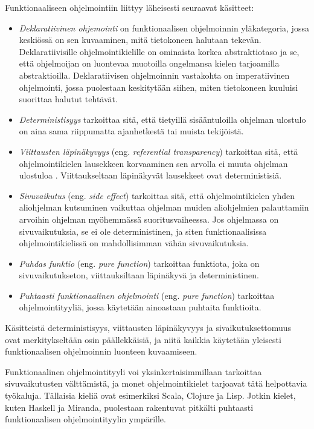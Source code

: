 Funktionaaliseen ohjelmointiin liittyy läheisesti seuraavat käsitteet:
\begin{itemize}
	\item \textit{Deklaratiivinen ohjemointi} on funktionaalisen ohjelmoinnin yläkategoria, jossa keskiössä on sen kuvaaminen, mitä tietokoneen halutaan tekevän. Deklaratiivisille ohjelmointikielille on ominaista korkea abstraktiotaso ja se, että ohjelmoijan on luontevaa muotoilla ongelmansa kielen tarjoamilla abstraktioilla. Deklaratiivisen ohjelmoinnin vastakohta on imperatiivinen ohjelmointi, jossa puolestaan keskitytään siihen, miten tietokoneen kuuluisi suorittaa halutut tehtävät.

	\item \textit{Deterministisyys} tarkoittaa sitä, että tietyillä sisääntuloilla ohjelman ulostulo on aina sama riippumatta ajanhetkestä tai muista tekijöistä.

	\item \textit{Viittausten läpinäkyvyys} (eng. \textit{referential transparency}) tarkoittaa sitä, että ohjelmointikielen lausekkeen korvaaminen sen arvolla ei muuta ohjelman ulostuloa \citep{hudak1989conception}. Viittaukseltaan läpinäkyvät lausekkeet ovat deterministisiä.

	\item \textit{Sivuvaikutus} (eng. \textit{side effect}) tarkoittaa sitä, että ohjelmointikielen yhden aliohjelman kutsuminen vaikuttaa ohjelman muiden aliohjelmien palauttamiin arvoihin ohjelman myöhemmässä suoritusvaiheessa. Jos ohjelmassa on sivuvaikutuksia, se ei ole deterministinen, ja siten funktionaalisissa ohjelmointikielissä on mahdollisimman vähän sivuvaikutuksia.

	\item \textit{Puhdas funktio} (eng. \textit{pure function}) tarkoittaa funktiota, joka on sivuvaikutukseton, viittauksiltaan läpinäkyvä ja deterministinen.

	\item \textit{Puhtaasti funktionaalinen ohjelmointi} (eng. \textit{pure function}) tarkoittaa ohjelmointityyliä, jossa käytetään ainoastaan puhtaita funktioita.
\end{itemize}

Käsitteistä deterministisyys, viittausten läpinäkyvyys ja sivaikutuksettomuus ovat merkitykseltään osin päällekkäisiä, ja niitä kaikkia käytetään yleisesti funktionaalisen ohjelmoinnin luonteen kuvaamiseen.

Funktionaalinen ohjelmointityyli voi yksinkertaisimmillaan tarkoittaa sivuvaikutusten välttämistä, ja monet ohjelmointikielet tarjoavat tätä helpottavia työkaluja. Tällaisia kieliä ovat esimerkiksi Scala, Clojure ja Lisp. Jotkin kielet, kuten Haskell ja Miranda, puolestaan rakentuvat pitkälti puhtaasti funktionaalisen ohjelmointityylin ympärille.

